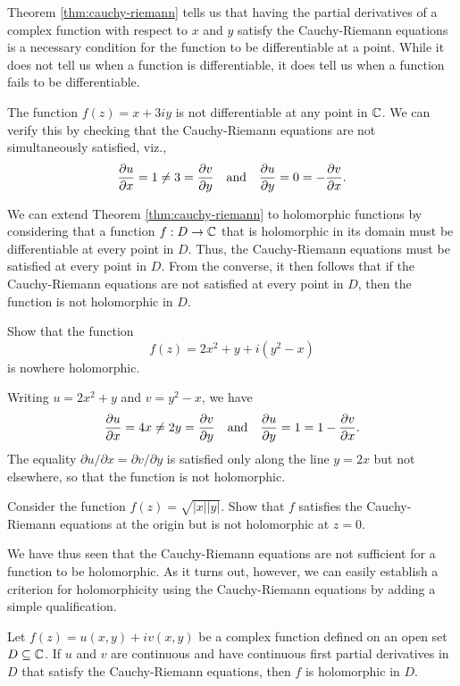 Theorem \ref{thm:cauchy-riemann} tells us that having the partial derivatives of a complex function with respect to \(x\) and \(y\) satisfy the Cauchy-Riemann equations is a necessary condition for the function to be differentiable at a point. While it does not tell us when a function is differentiable, it does tell us when a function fails to be differentiable.

\begin{example}
    The function \(f(z) = x + 3iy\) is not differentiable at any point in \(\mathbb{C}\). We can verify this by checking that the Cauchy-Riemann equations are not simultaneously satisfied, viz.,
    \[
        \frac{\partial u}{\partial x} = 1 \neq 3 = \frac{\partial v}{\partial y} \quad \text{and} \quad \frac{\partial u}{\partial y} =  0 = -\frac{\partial v}{\partial x}.
    \]
\end{example}

We can extend Theorem \ref{thm:cauchy-riemann} to holomorphic functions by considering that a function \(f : D \to \mathbb{C}\) that is holomorphic in its domain must be differentiable at every point in \(D\). Thus, the Cauchy-Riemann equations must be satisfied at every point in \(D\). From the converse, it then follows that if the Cauchy-Riemann equations are not satisfied at every point in \(D\), then the function is not holomorphic in \(D\).

\begin{example}
    Show that the function
    \[
        f(z) = 2x^2 + y + i(y^2 - x)
    \]
    is nowhere holomorphic.

    \begin{solution}
        Writing \(u = 2x^2 + y\) and \(v = y^2 - x\), we have
        \[
            \frac{\partial u}{\partial x} = 4x \neq 2y = \frac{\partial v}{\partial y} \quad \text{and} \quad \frac{\partial u}{\partial y} = 1 = 1 -\frac{\partial v}{\partial x}.
        \]
        The equality \(\partial u / \partial x = \partial v / \partial y\) is satisfied only along the line \(y = 2x\) but not elsewhere, so that the function is not holomorphic.
    \end{solution}
\end{example}

\begin{example}
    Consider the function \(f(z) = \sqrt{|x||y|}\). Show that \(f\) satisfies the Cauchy-Riemann equations at the origin but is not holomorphic at \(z = 0\).
\end{example}

We have thus seen that the Cauchy-Riemann equations are not sufficient for a function to be holomorphic. As it turns out, however, we can easily establish a criterion for holomorphicity using the Cauchy-Riemann equations by adding a simple qualification.

\begin{theorem}
    Let \(f(z) = u(x, y) + iv(x, y)\) be a complex function defined on an open set \(D \subseteq \mathbb{C}\). If \(u\) and \(v\) are continuous and have continuous first partial derivatives in \(D\) that satisfy the Cauchy-Riemann equations, then \(f\) is holomorphic in \(D\).
\end{theorem}